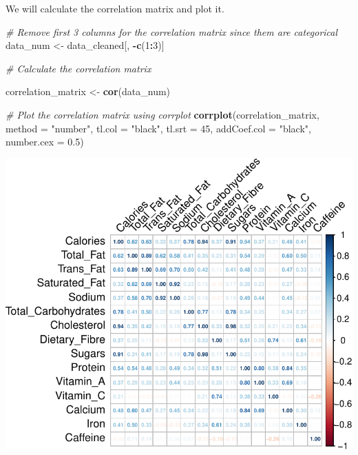 \documentclass[
]{article}
\newenvironment{Shaded}{\begin{snugshade}}{\end{snugshade}}
\newcommand{\AttributeTok}[1]{\textcolor[rgb]{0.13,0.29,0.53}{#1}}
\newcommand{\CommentTok}[1]{\textcolor[rgb]{0.56,0.35,0.01}{\textit{#1}}}
\newcommand{\DecValTok}[1]{\textcolor[rgb]{0.00,0.00,0.81}{#1}}
\newcommand{\FloatTok}[1]{\textcolor[rgb]{0.00,0.00,0.81}{#1}}
\newcommand{\FunctionTok}[1]{\textcolor[rgb]{0.13,0.29,0.53}{\textbf{#1}}}
\newcommand{\NormalTok}[1]{#1}
\newcommand{\OtherTok}[1]{\textcolor[rgb]{0.56,0.35,0.01}{#1}}
\newcommand{\SpecialCharTok}[1]{\textcolor[rgb]{0.81,0.36,0.00}{\textbf{#1}}}
\newcommand{\StringTok}[1]{\textcolor[rgb]{0.31,0.60,0.02}{#1}}
\begin{document}
We will calculate the correlation matrix and plot it.

\begin{Shaded}
\begin{Highlighting}[]
\CommentTok{\# Remove first 3 columns for the correlation matrix since them are categorical}
\NormalTok{data\_num }\OtherTok{\textless{}{-}}\NormalTok{ data\_cleaned[, }\SpecialCharTok{{-}}\FunctionTok{c}\NormalTok{(}\DecValTok{1}\SpecialCharTok{:}\DecValTok{3}\NormalTok{)]}

\CommentTok{\# Calculate the correlation matrix}

\NormalTok{correlation\_matrix }\OtherTok{\textless{}{-}} \FunctionTok{cor}\NormalTok{(data\_num)}

\CommentTok{\# Plot the correlation matrix using corrplot}
\FunctionTok{corrplot}\NormalTok{(correlation\_matrix, }\AttributeTok{method =} \StringTok{"number"}\NormalTok{, }\AttributeTok{tl.col =} \StringTok{"black"}\NormalTok{, }
         \AttributeTok{tl.srt =} \DecValTok{45}\NormalTok{, }\AttributeTok{addCoef.col =} \StringTok{"black"}\NormalTok{, }\AttributeTok{number.cex =} \FloatTok{0.5}\NormalTok{)}
\end{Highlighting}
\end{Shaded}

\begin{center}\includegraphics{Statistical_Learning_Final_Report_files/figure-latex/correlation_analysis-1} \end{center}
\end{document}
